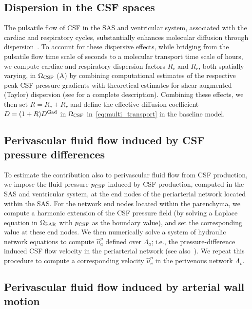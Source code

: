 \documentclass[fleqn,10pt]{wlscirep}
\begin{document}
\subsection*{Dispersion in the CSF spaces}

The pulsatile flow of CSF in the SAS and ventricular system,
associated with the cardiac and respiratory cycles, substantially
enhances molecular diffusion through
dispersion~\cite{taylor1953dispersion, watson1983diffusion,
  asgari2016glymphatic, sharp2019dispersion, ray2021quantitative,
  troyetsky2021dispersion}. To account for these dispersive effects,
while bridging from the pulsatile flow time scale of seconds to a
molecular transport time scale of hours, we compute cardiac and
respiratory dispersion factors $R_c$ and $R_r$, both
spatially-varying, in $\Omega_{\rm CSF}$ (A) by
combining computational estimates of the respective peak CSF pressure
gradients with theoretical estimates for shear-augmented (Taylor)
dispersion \cite{taylor1953dispersion, watson1983diffusion,
  sharp2019dispersion} (see  for a complete
description). Combining these effects, we then set $R = R_c + R_r$ and
define the effective diffusion coefficient $D = (1 + R) D^{\rm Gad}$
in $\Omega_{\rm CSF}$ in~\eqref{eq:multi_transport} in the baseline model.

\subsection*{Perivascular fluid flow induced by CSF pressure differences}

To estimate the contribution also to perivascular fluid flow from CSF
production, we impose the fluid pressure $p_{\rm CSF}$ induced by CSF
production, computed in the SAS and ventricular system, at the end
nodes of the periarterial network located within the SAS. For the
network end nodes located within the parenchyma, we compute a harmonic
extension of the CSF pressure field (by solving a Laplace equation in
$\Omega_{\rm PAR}$ with $p_{\rm CSF}$ as the boundary value), and set
the corresponding value at these end nodes. We then numerically solve
a system of hydraulic network equations to compute $\hat{u}^p_a$
defined over $\Lambda_a$; i.e., the pressure-difference induced CSF
flow velocity in the periarterial network (see
also~). We repeat this procedure to
compute a corresponding velocity $\hat{u}^p_v$ in the perivenous
network $\Lambda_v$.

\subsection*{Perivascular fluid flow induced by arterial wall motion}
\end{document}

